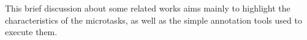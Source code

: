 




This brief discussion about some related works aims mainly to highlight the characteristics of the microtasks, as well as the simple annotation tools used to execute them.